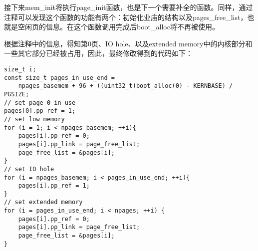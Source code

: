 \begin{exerciseSolution}{1}
    \par 接下来mem\_init将执行page\_init函数，也是下一个需要补全的函数。同样，通过注释可以发现这个函数的功能有两个：初始化业庙的结构以及pages\_free\_list，也就是空闲页的信息。在这个函数调用完成后boot\_alloc将不再被使用。
    \par 根据注释中的信息，得知第0页、IO hole、以及extended memory中的内核部分和一些其它部分已经被占用，因此，最终修改得到的代码如下：
    \begin{lstlisting}
size_t i;
const size_t pages_in_use_end =
    npages_basemem + 96 + ((uint32_t)boot_alloc(0) - KERNBASE) / PGSIZE;
// set page 0 in use
pages[0].pp_ref = 1;
// set low memory
for (i = 1; i < npages_basemem; ++i){
    pages[i].pp_ref = 0;
    pages[i].pp_link = page_free_list;
    page_free_list = &pages[i];
}
// set IO hole
for (i = npages_basemem; i < pages_in_use_end; ++i){
    pages[i].pp_ref = 1;
}
// set extended memory
for (i = pages_in_use_end; i < npages; ++i) {
    pages[i].pp_ref = 0;
    pages[i].pp_link = page_free_list;
    page_free_list = &pages[i];
}
    \end{lstlisting}


\end{exerciseSolution}

